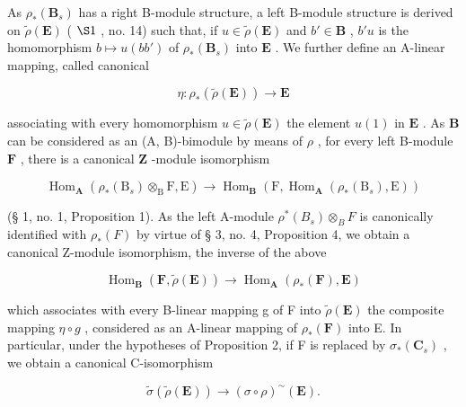 As \(\rho_{*}(\mathbf{B}_{s})\) has a right B-module structure, a left B-module structure is derived on \(\tilde{\rho}(\mathbf{E})\) ( \(\S 1\) , no. 14) such that, if \(u \in \tilde{\rho}(\mathbf{E})\) and \(b' \in \mathbf{B}\) , \(b'u\) is the homomorphism \(b \mapsto u(bb')\) of \(\rho_{*}(\mathbf{B}_{s})\) into \(\mathbf{E}\) . We further define an A-linear mapping, called canonical

\[
\eta : \rho_ {*} (\tilde {\rho} (\mathbf {E})) \rightarrow \mathbf {E}\tag{7}
\]

associating with every homomorphism \(u \in \tilde{\rho}(\mathbf{E})\) the element \(u(1)\) in \(\mathbf{E}\) . As \(\mathbf{B}\) can be considered as an (A, B)-bimodule by means of \(\rho\) , for every left B-module \(\mathbf{F}\) , there is a canonical \(\mathbf{Z}\) -module isomorphism

\[
\operatorname{Hom} _ {\mathbf {A}} \left(\rho_ {*} (\mathrm{B} _ {s}) \otimes_ {\mathrm{B}} \mathrm{F}, \mathrm{E}\right)\rightarrow \operatorname{Hom} _ {\mathbf {B}} (\mathrm{F}, \operatorname{Hom} _ {\mathbf {A}} \left(\rho_ {*} (\mathrm{B} _ {s}), \mathrm{E}\right))
\]

(§ 1, no. 1, Proposition 1). As the left A-module \(\rho^{*}(B_{s}) \otimes_{B} F\) is canonically identified with \(\rho_{*}(F)\) by virtue of § 3, no. 4, Proposition 4, we obtain a canonical Z-module isomorphism, the inverse of the above

\[
\operatorname{Hom} _ {\mathbf {B}} (\mathbf {F}, \tilde {\rho} (\mathbf {E})) \rightarrow \operatorname{Hom} _ {\mathbf {A}} (\rho_ {*} (\mathbf {F}), \mathbf {E})\tag{8}
\]

which associates with every B-linear mapping g of F into \(\tilde{\rho}(\mathbf{E})\) the composite mapping \(\eta \circ g\) , considered as an A-linear mapping of \(\rho_{*}(\mathbf{F})\) into E. In particular, under the hypotheses of Proposition 2, if F is replaced by \(\sigma_{*}(\mathbf{C}_{s})\) , we obtain a canonical C-isomorphism

\[
\tilde {\sigma} (\tilde {\rho} (\mathbf {E})) \rightarrow (\sigma \circ \rho) ^ {\sim} (\mathbf {E}).\tag{9}
\]

